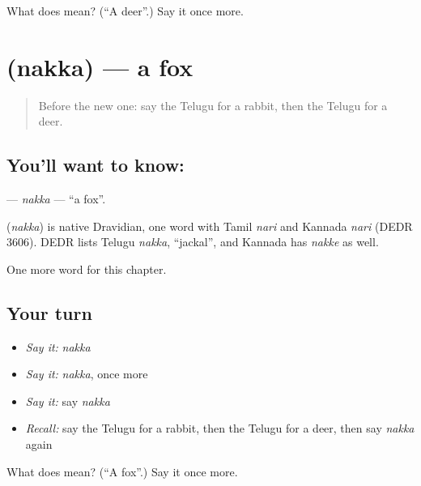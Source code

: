 \begin{tcolorbox}[breakable,colback=teal!4,colframe=teal!35!black,title={Before you move on}]
What does  mean? (\textquotedblleft{}A deer\textquotedblright{}.) Say it once more.
\end{tcolorbox}
\section[\texorpdfstring{\te{నక్క} (nakka)}{నక్క (nakka)}]{ (nakka) — a fox}

\label{lesson:TE-C124-nakka}



\begin{quote}
Before the new one: say the Telugu for a rabbit, then the Telugu for a deer.
\end{quote}

\subsection*{You'll want to know: }
\textbf{} — \emph{nakka} — \textquotedblleft{}a fox\textquotedblright{}.

\begin{cousinweb}
\textbf{} (\emph{nakka}) is native Dravidian, one word with Tamil \emph{nari} and Kannada \emph{nari} (DEDR 3606). DEDR lists Telugu \emph{nakka}, \textquotedblleft{}jackal\textquotedblright{}, and Kannada has \emph{nakke} as well.
\end{cousinweb}

\begin{grammarlens}[title={What you've built}]
One more word for this chapter.
\end{grammarlens}

\subsection*{Your turn}
\begin{itemize}
\raggedright
  \item \emph{Say it:} \emph{nakka}
  \item \emph{Say it:} \emph{nakka}, once more
  \item \emph{Say it:} say \emph{nakka}
  \item \emph{Recall:} say the Telugu for a rabbit, then the Telugu for a deer, then say \emph{nakka} again
\end{itemize}

\begin{tcolorbox}[breakable,colback=teal!4,colframe=teal!35!black,title={Before you move on}]
What does  mean? (\textquotedblleft{}A fox\textquotedblright{}.) Say it once more.
\end{tcolorbox}
